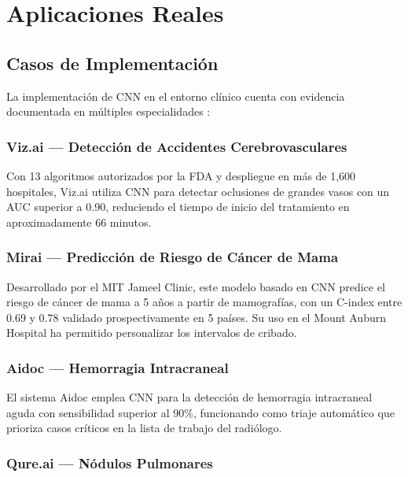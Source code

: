 
\section{Aplicaciones Reales}

\subsection{Casos de Implementación}

La implementación de CNN en el entorno clínico cuenta con evidencia documentada en múltiples especialidades \parencite{Laurent2025}:

\subsubsection{Viz.ai — Detección de Accidentes Cerebrovasculares}

Con 13 algoritmos autorizados por la FDA y despliegue en más de 1,600 hospitales, Viz.ai utiliza CNN para detectar oclusiones de grandes vasos con un AUC superior a 0.90, reduciendo el tiempo de inicio del tratamiento en aproximadamente 66 minutos.

\subsubsection{Mirai — Predicción de Riesgo de Cáncer de Mama}

Desarrollado por el MIT Jameel Clinic, este modelo basado en CNN predice el riesgo de cáncer de mama a 5 años a partir de mamografías, con un C-index entre 0.69 y 0.78 validado prospectivamente en 5 países. Su uso en el Mount Auburn Hospital ha permitido personalizar los intervalos de cribado.

\subsubsection{Aidoc — Hemorragia Intracraneal}

El sistema Aidoc emplea CNN para la detección de hemorragia intracraneal aguda con sensibilidad superior al 90\%, funcionando como triaje automático que prioriza casos críticos en la lista de trabajo del radiólogo.

\subsubsection{Qure.ai — Nódulos Pulmonares}

